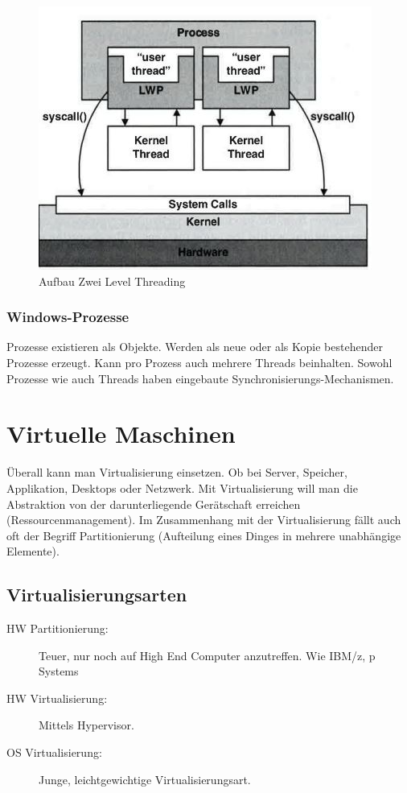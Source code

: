 \begin{figure}[h!]
	\centering
	\includegraphics[width=0.7\linewidth]{fig/system-software-aufbau-2-level-threading}
	\caption{Aufbau Zwei Level Threading}
	\label{fig:system-software-aufbau-2-level-threading}
\end{figure}

\subsubsection{Windows-Prozesse}
Prozesse existieren als Objekte. Werden als neue oder als Kopie bestehender Prozesse erzeugt. Kann pro Prozess auch mehrere Threads beinhalten. Sowohl Prozesse wie auch Threads haben eingebaute Synchronisierungs-Mechanismen.

\section{Virtuelle Maschinen}
Überall kann man Virtualisierung einsetzen. Ob bei Server, Speicher, Applikation, Desktops oder Netzwerk. Mit Virtualisierung will man die Abstraktion von der darunterliegende Gerätschaft erreichen (Ressourcenmanagement). Im Zusammenhang mit der Virtualisierung fällt auch oft der Begriff Partitionierung (Aufteilung eines Dinges in mehrere unabhängige Elemente).

\newpage

\subsection{Virtualisierungsarten}
\label{sec:virtualisierungsarten}
\begin{description}
	\item[HW Partitionierung:] Teuer, nur noch auf High End Computer anzutreffen. Wie IBM/z, p Systems
	\item[HW Virtualisierung:] Mittels Hypervisor.
	\item[OS Virtualisierung:] Junge, leichtgewichtige Virtualisierungsart.
\end{description}

